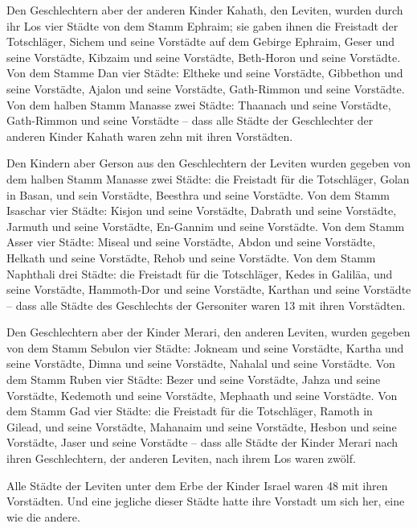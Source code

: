  Den Geschlechtern aber der anderen Kinder Kahath, den
Leviten, wurden durch ihr Los vier Städte von dem Stamm Ephraim;
 sie gaben ihnen die Freistadt der Totschläger, Sichem
und seine Vorstädte auf dem Gebirge Ephraim, Geser und seine Vorstädte,
 Kibzaim und seine Vorstädte, Beth-Horon und seine
Vorstädte.  Von dem Stamme Dan vier Städte: Eltheke und
seine Vorstädte, Gibbethon und seine Vorstädte,  Ajalon
und seine Vorstädte, Gath-Rimmon und seine Vorstädte. 
Von dem halben Stamm Manasse zwei Städte: Thaanach und seine Vorstädte,
Gath-Rimmon und seine Vorstädte --  dass alle Städte der
Geschlechter der anderen Kinder Kahath waren zehn mit ihren Vorstädten.

 Den Kindern aber Gerson aus den Geschlechtern der
Leviten wurden gegeben von dem halben Stamm Manasse zwei Städte: die
Freistadt für die Totschläger, Golan in Basan, und sein Vorstädte,
Beesthra und seine Vorstädte.  Von dem Stamm Isaschar
vier Städte: Kisjon und seine Vorstädte, Dabrath und seine Vorstädte,
 Jarmuth und seine Vorstädte, En-Gannim und seine
Vorstädte.  Von dem Stamm Asser vier Städte: Miseal und
seine Vorstädte, Abdon und seine Vorstädte,  Helkath und
seine Vorstädte, Rehob und seine Vorstädte.  Von dem
Stamm Naphthali drei Städte: die Freistadt für die Totschläger, Kedes in
Galiläa, und seine Vorstädte, Hammoth-Dor und seine Vorstädte, Karthan
und seine Vorstädte --  dass alle Städte des Geschlechts
der Gersoniter waren 13 mit ihren Vorstädten.

 Den Geschlechtern aber der Kinder Merari, den anderen
Leviten, wurden gegeben von dem Stamm Sebulon vier Städte: Jokneam und
seine Vorstädte, Kartha und seine Vorstädte,  Dimna und
seine Vorstädte, Nahalal und seine Vorstädte.  Von dem
Stamm Ruben vier Städte: Bezer und seine Vorstädte, Jahza und seine
Vorstädte,  Kedemoth und seine Vorstädte, Mephaath und
seine Vorstädte.  Von dem Stamm Gad vier Städte: die
Freistadt für die Totschläger, Ramoth in Gilead, und seine Vorstädte,
 Mahanaim und seine Vorstädte, Hesbon und seine
Vorstädte, Jaser und seine Vorstädte --  dass alle Städte
der Kinder Merari nach ihren Geschlechtern, der anderen Leviten, nach
ihrem Los waren zwölf.

 Alle Städte der Leviten unter dem Erbe der Kinder Israel
waren 48 mit ihren Vorstädten.  Und eine jegliche dieser
Städte hatte ihre Vorstadt um sich her, eine wie die andere.

